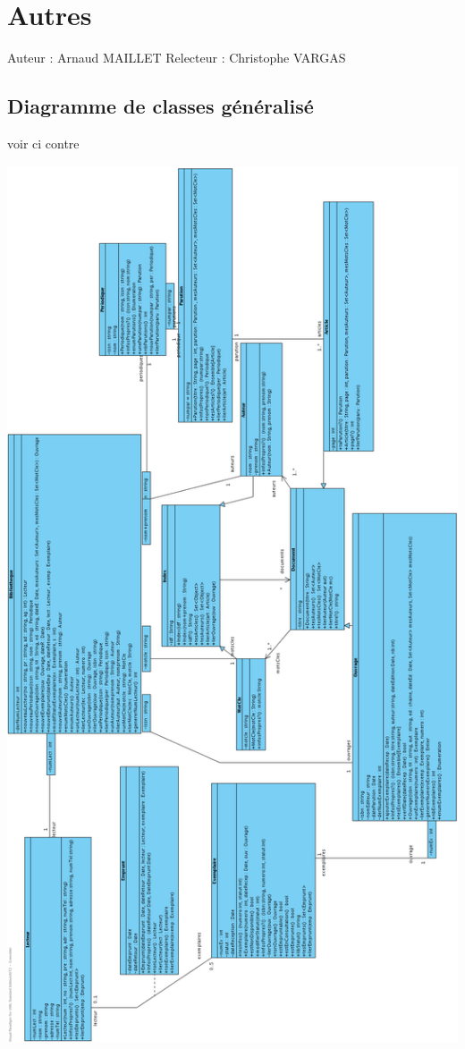 \documentclass[a4paper,10pt]{report}
\begin{document}
\newpage

\chapter*{Autres}

Auteur : Arnaud MAILLET
Relecteur : Christophe VARGAS

\bigskip

\section*{Diagramme de classes généralisé}
\bigskip
\bigskip
\begin{center}
voir ci contre
\end{center}
\includegraphics[height=260mm]{diagrammeDeClasseGeneralise.png}
\newpage
\end{document}

